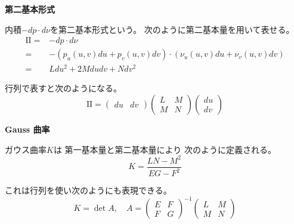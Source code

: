 \documentclass[12pt,b5paper]{ltjsarticle}
\begin{document}
\textbf{第二基本形式}

内積$-dp \cdot d\nu$を第二基本形式という。
次のように第二基本量を用いて表せる。
\begin{align}
 \mathrm{II} =& -dp \cdot d\nu\\
 =&
 - (p_{u}(u,v)du + p_{v}(u,v)dv) \cdot (\nu_{u}(u,v)du + \nu_{v}(u,v)dv)
 \\
 =&
 L du^2 + 2M dudv + N dv^2
\end{align}

行列で表すと次のようになる。
\begin{equation}
 \mathrm{II}=
   \begin{pmatrix}
   du & dv
  \end{pmatrix}
  \begin{pmatrix}
   L & M \\
   M & N
  \end{pmatrix}
  \begin{pmatrix}
   du \\ dv
  \end{pmatrix}
\end{equation}



\textbf{Gauss 曲率}

ガウス曲率$K$は
第一基本量と第二基本量により
次のように定義される。
\begin{equation}
 K= \frac{LN-M^2}{EG-F^2}
\end{equation}

これは行列を使い次のようにも表現できる。
\begin{equation}
 K=\det{A}
  ,\quad
 A=
  \begin{pmatrix}
   E & F \\
   F & G
  \end{pmatrix}^{-1}
  \begin{pmatrix}
   L & M \\
   M & N
  \end{pmatrix}
\end{equation}


\hrulefill
\end{document}
